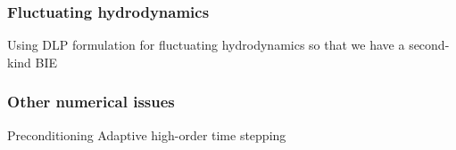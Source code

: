 \subsubsection{Fluctuating hydrodynamics}
Using DLP formulation for fluctuating hydrodynamics so that we have a
second-kind BIE

\subsubsection{Other numerical issues}
\label{subsec:NumericalIssues}
Preconditioning
Adaptive high-order time stepping



 
